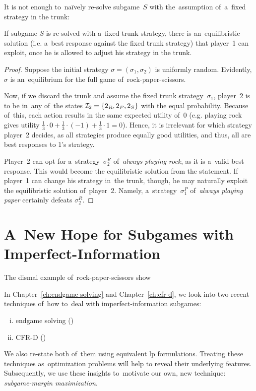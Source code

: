 It is not enough to~na{\"i}vely re-solve subgame~$S$ with the~assumption of~a~fixed strategy in the trunk:
\begin{claim}
  \label{claim:rps-subgame}
  If subgame $S$ is re-solved with a~fixed trunk strategy, there is an~equilibristic solution (i.e. a~best response against the fixed trunk strategy) that player~1 can exploit, once he is allowed to adjust his strategy in the trunk.
\end{claim}
\begin{proof}
  Suppose the initial strategy $\sigma = (\sigma_1, \sigma_2)$ is uniformly random\footnotemark{}.
  Evidently, $\sigma$ is an~equilibrium for the full game of~rock-paper-scissors.

  Now, if we discard the trunk and assume the fixed trunk strategy~$\sigma_1$, player~2 is to be in~any of~the states $\mathcal{I}_2 = \{2_R, 2_P, 2_S\}$ with the equal probability.
  Because of~this, each action results in the same expected utility of~$0$ (e.g. playing rock gives utility $\frac{1}{3} \cdot 0 + \frac{1}{3} \cdot (-1) + \frac{1}{3} \cdot 1 = 0$).
  Hence, it is irrelevant for which strategy player~2 decides, as all strategies produce equally good utilities, and thus, all are best responses to $1$'s strategy\footnotemark.

  Player~2 can opt for a~strategy~$\sigma^R_2$ of~\emph{always playing rock}, as it is a~valid best response.
  This would become the equilibristic solution from the statement.
  If player~1 can change his strategy in~the trunk, though, he may naturally exploit the equilibristic solution of~player~2.
  Namely, a~strategy~$\sigma^P_1$ of~\emph{always playing paper} certainly defeats $\sigma^R_2$.
\end{proof}

\section{A~New Hope for Subgames with Imperfect-Information}
The dismal example of~rock-paper-scissors show \todo

In Chapter~\ref{ch:endgame-solving} and Chapter~\ref{ch:cfr-d}, we look into two recent techniques of~how to~deal with imperfect-information subgames:
\begin{enumerate}[(i)]
  \item endgame solving (\cite{GanzfriedSandholm13improving})
  \item CFR-D (\cite{BurchJohansonBowling13})
\end{enumerate}
We also re-state both of~them using equivalent \acrshort{lp} formulations.
Treating these techniques as~optimization problems will help to reveal their underlying features.
Subsequently, we use these insights to~motivate our own, new technique: \emph{subgame-margin maximization}.
